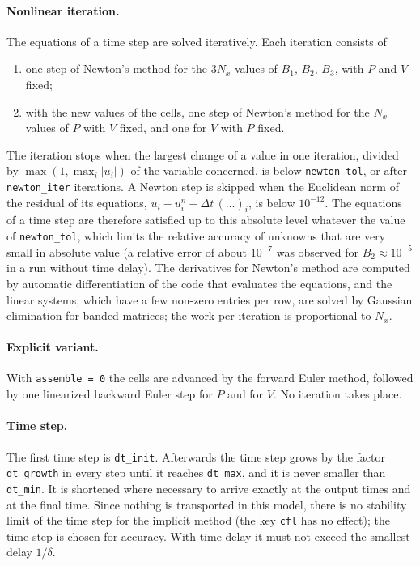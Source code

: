 \documentclass[11pt]{article}
\newcommand{\code}[1]{\texttt{#1}}
\newcommand{\Dt}{\Delta t}
\begin{document}
\paragraph{Nonlinear iteration.}
The equations of a time step are solved iteratively. Each iteration consists of
\begin{enumerate}
  \item one step of Newton's method for the $3N_x$ values of $B_1$, $B_2$, $B_3$, with $P$ and $V$ fixed;
  \item with the new values of the cells, one step of Newton's method for the $N_x$ values of $P$ with $V$ fixed, and one for $V$ with $P$ fixed.
\end{enumerate}
The iteration stops when the largest change of a value in one iteration, divided by $\max(1,\max_i|u_i|)$ of the variable concerned, is below \code{newton\_tol}, or after \code{newton\_iter} iterations.
A Newton step is skipped when the Euclidean norm of the residual of its equations, $u_i-u_i^n-\Dt\,(\ldots)_i$, is below $10^{-12}$.
The equations of a time step are therefore satisfied up to this absolute level whatever the value of \code{newton\_tol}, which limits the relative accuracy of unknowns that are very small in absolute value (a relative error of about $10^{-7}$ was observed for $B_2\approx10^{-5}$ in a run without time delay).
The derivatives for Newton's method are computed by automatic differentiation of the code that evaluates the equations, and the linear systems, which have a few non-zero entries per row, are solved by Gaussian elimination for banded matrices; the work per iteration is proportional to $N_x$.

\paragraph{Explicit variant.}
With \code{assemble = 0} the cells are advanced by the forward Euler method, followed by one linearized backward Euler step for $P$ and for $V$. No iteration takes place.

\paragraph{Time step.}
The first time step is \code{dt\_init}. Afterwards the time step grows by the factor \code{dt\_growth} in every step until it reaches \code{dt\_max}, and it is never smaller than \code{dt\_min}.
It is shortened where necessary to arrive exactly at the output times and at the final time.
Since nothing is transported in this model, there is no stability limit of the time step for the implicit method (the key \code{cfl} has no effect); the time step is chosen for accuracy.
With time delay it must not exceed the smallest delay $1/\delta$.
\end{document}

